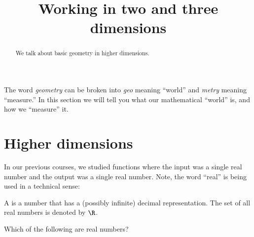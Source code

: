 \documentclass{ximera}
\title[Dig-In:]{Working in two and three dimensions}
\begin{document}
\begin{abstract}
  We talk about basic geometry in higher dimensions.
\end{abstract}
\maketitle


The word \textit{geometry} can be broken into \textit{geo} meaning
``world'' and \textit{metry} meaning ``measure.'' In this section we
will tell you what our mathematical ``world'' is, and how we ``measure''
it.

\section{Higher dimensions}

In our previous courses, we studied functions where the input was a
single real number and the output was a single real number. Note, the
word ``real'' is being used in a technical sense:

\begin{definition}
  A  is a number that has a (possibly infinite)
  decimal representation. The set of all real numbers is denoted by
  $\R$.
\end{definition}
\begin{question}
  Which of the following are real numbers?
  \begin{selectAll}
    \choice[correct]{$\pi$}
    \choice{$\infty$}
  \end{selectAll}
\end{question}
\end{document}
